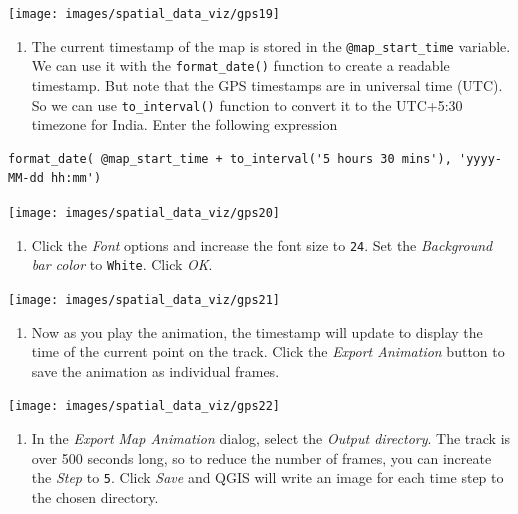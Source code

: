 \documentclass[
  12pt,
  a4paper]{article}
\providecommand{\tightlist}{%
  \setlength{\itemsep}{0pt}\setlength{\parskip}{0pt}}
\begin{document}
\begin{center}\texttt{[image: images/spatial\_data\_viz/gps19]} \end{center}

\begin{enumerate}
\def\labelenumi{\arabic{enumi}.}
\setcounter{enumi}{19}
\tightlist
\item
  The current timestamp of the map is stored in the
  \texttt{@map\_start\_time} variable. We can use it with the
  \texttt{format\_date()} function to create a readable timestamp. But
  note that the GPS timestamps are in universal time (UTC). So we can
  use \texttt{to\_interval()} function to convert it to the UTC+5:30
  timezone for India. Enter the following expression
\end{enumerate}

\begin{verbatim}
format_date( @map_start_time + to_interval('5 hours 30 mins'), 'yyyy-MM-dd hh:mm')
\end{verbatim}

\begin{center}\texttt{[image: images/spatial\_data\_viz/gps20]} \end{center}

\begin{enumerate}
\def\labelenumi{\arabic{enumi}.}
\setcounter{enumi}{20}
\tightlist
\item
  Click the \emph{Font} options and increase the font size to
  \texttt{24}. Set the \emph{Background bar color} to \texttt{White}.
  Click \emph{OK}.
\end{enumerate}

\begin{center}\texttt{[image: images/spatial\_data\_viz/gps21]} \end{center}

\begin{enumerate}
\def\labelenumi{\arabic{enumi}.}
\setcounter{enumi}{21}
\tightlist
\item
  Now as you play the animation, the timestamp will update to display
  the time of the current point on the track. Click the \emph{Export
  Animation} button to save the animation as individual frames.
\end{enumerate}

\begin{center}\texttt{[image: images/spatial\_data\_viz/gps22]} \end{center}

\begin{enumerate}
\def\labelenumi{\arabic{enumi}.}
\setcounter{enumi}{22}
\tightlist
\item
  In the \emph{Export Map Animation} dialog, select the \emph{Output
  directory}. The track is over 500 seconds long, so to reduce the
  number of frames, you can increate the \emph{Step} to \texttt{5}.
  Click \emph{Save} and QGIS will write an image for each time step to
  the chosen directory.
\end{enumerate}
\end{document}
